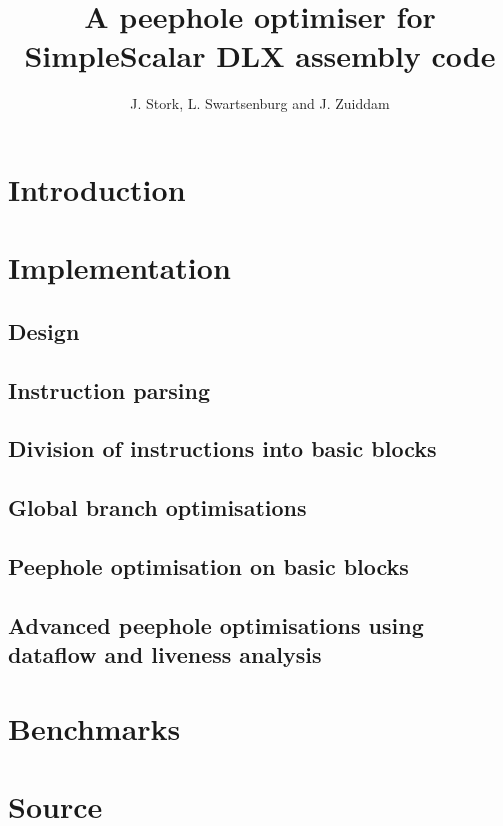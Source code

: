 \documentclass{scrreprt}
\title{A peephole optimiser for SimpleScalar DLX assembly code}
\author{J. Stork, L. Swartsenburg and J. Zuiddam}
\begin{document}
\maketitle


\chapter{Introduction}
\label{sec:introduction}



\chapter{Implementation}

\section{Design}
\label{sec:design}


\section{Instruction parsing}
\label{sec:parsing}


\section{Division of instructions into basic blocks}
\label{sec:splitting}


\section{Global branch optimisations}
\label{sec:global}


\section{Peephole optimisation on basic blocks}
\label{sec:peephole}


\section{Advanced peephole optimisations using dataflow and liveness analysis}
\label{sec:advanced}



\chapter{Benchmarks}
\label{sec:benchmarks}



\appendix
\chapter{Source}
\label{ch:source}

\end{document}
